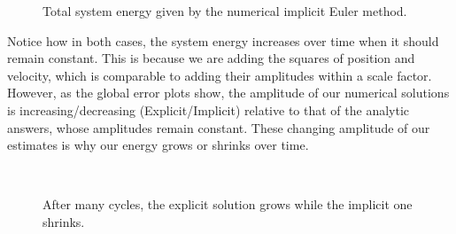 \documentclass[a4paper, 11pt]{article}
\begin{document}
\begin{figure}[H]
\caption{Total system energy given by the numerical implicit Euler method.}
\end{figure}

\par Notice how in both cases, the system energy increases over time when it should remain constant. This is because we are adding the squares of position and velocity, which is comparable to adding their amplitudes within a scale factor. However, as the global error plots show, the amplitude of our numerical solutions  is increasing/decreasing (Explicit/Implicit) relative to that of the analytic answers, whose amplitudes remain constant. These changing amplitude of our estimates is why our energy grows or shrinks over time.

 \begin{figure}[H]
\\
\caption{After many cycles, the explicit solution grows while the implicit one shrinks.}
\end{figure}
\end{document}
